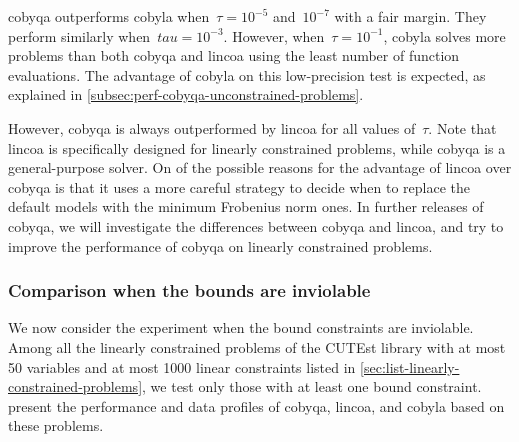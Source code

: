 \gls{cobyqa} outperforms \gls{cobyla} when~$\tau = 10^{-5}$ and~$10^{-7}$ with a fair margin.
They perform similarly when~$tau = 10^{-3}$.
However, when~$\tau = 10^{-1}$, \gls{cobyla} solves more problems than both \gls{cobyqa} and \gls{lincoa} using the least number of function evaluations.
The advantage of \gls{cobyla} on this low-precision test is expected, as explained in \cref{subsec:perf-cobyqa-unconstrained-problems}.

However, \gls{cobyqa} is always outperformed by \gls{lincoa} for all values of~$\tau$.
Note that \gls{lincoa} is specifically designed for linearly constrained problems, while \gls{cobyqa} is a general-purpose solver.
On of the possible reasons for the advantage of \gls{lincoa} over \gls{cobyqa} is that it uses a more careful strategy to decide when to replace the default models with the minimum Frobenius norm ones.
In further releases of \gls{cobyqa}, we will investigate the differences between \gls{cobyqa} and \gls{lincoa}, and try to improve the performance of \gls{cobyqa} on linearly constrained problems.

\subsubsection{Comparison when the bounds are inviolable}

We now consider the experiment when the bound constraints are inviolable.
Among all the linearly constrained problems of the CUTEst library with at most \num{50} variables and at most \num[group-minimum-digits=4]{1000} linear constraints listed in \cref{sec:list-linearly-constrained-problems}, we test only those with at least one bound constraint.
 present the performance and data profiles of \gls{cobyqa}, \gls{lincoa}, and \gls{cobyla} based on these problems.

